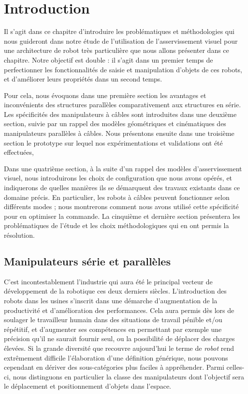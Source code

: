 \chapter{Introduction}

Il s'agit dans ce chapitre d'introduire les problématiques et méthodologies qui nous guideront dans notre étude de l'utilisation de l'asservissement visuel pour une architecture de robot très particulière que nous allons présenter dans ce chapitre. Notre objectif est double : il s'agit dans un premier temps de perfectionner les fonctionnalités de saisie et manipulation d'objets de ces robots, et d'améliorer leurs propriétés dans un second temps.

Pour cela, nous  évoquons dans une première section les avantages et inconvénients des structures parallèles comparativement aux structures en série. Les spécificités des manipulateurs à c\^ables sont introduites dans une deuxième section, suivie par un rappel des modèles géométriques et cinématiques des manipulateurs parallèles à c\^ables. Nous présentons ensuite dans une troisième section le prototype sur lequel nos expérimentations et validations ont été effectuées,

Dans une quatrième section, à la suite d'un rappel des modèles d'asser\-vissement visuel, nous introduirons les choix de configuration que nous avons opérés, et indiquerons de quelles manières ils se démarquent des travaux existants dans ce domaine précis. En particulier, les robots à câbles peuvent fonctionner selon différents modes ; nous montrerons comment nous avons utilisé cette spécificité pour en optimiser la commande. La cinquième et dernière section présentera les problématiques de l'étude et les choix méthodologiques qui en ont permis la résolution.

\section{Manipulateurs série et parallèles}

C'est incontestablement l'industrie qui aura été le principal vecteur de développe\-ment de la robotique ces deux derniers siècles. L'introduction des robots dans les usines s'inscrit dans une démarche d'augmentation de la productivité et d'amélio\-ration des performances. Cela aura permis dès lors de soulager le travailleur humain dans des situations de travail pénible et/ou répétitif, et d'augmenter ses compétences en permettant par exemple une précision qu'il ne saurait fournir seul, ou la possibilité de déplacer des charges élevées. Si la grande diversité que recouvre aujourd'hui le terme de {\it robot} rend extrêmement difficile l'élaboration d'une définition générique, nous pouvons cependant en dériver des sous-catégories plus faciles à appréhender. Parmi celles-ci, nous distinguons en particulier la classe des manipulateurs dont l'objectif sera le déplacement et positionnement d'objets dans l'espace.

